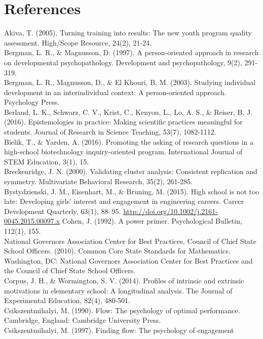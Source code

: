 \documentclass[]{msu-thesis}
\theoremstyle{definition}
\theoremstyle{definition}
\theoremstyle{definition}
\theoremstyle{remark}
\begin{document}
\chapter{References}\label{references}

Akiva, T. (2005). Turning training into results: The new youth program
quality assessment. High/Scope Resource, 24(2), 21-24.\\
Bergman, L. R., \& Magnusson, D. (1997). A person-oriented approach in
research on developmental psychopathology. Development and
psychopathology, 9(2), 291-319.\\
Bergman, L. R., Magnusson, D., \& El Khouri, B. M. (2003). Studying
individual development in an interindividual context: A person-oriented
approach. Psychology Press.\\
Berland, L. K., Schwarz, C. V., Krist, C., Kenyon, L., Lo, A. S., \&
Reiser, B. J. (2016). Epistemologies in practice: Making scientific
practices meaningful for students. Journal of Research in Science
Teaching, 53(7), 1082-1112.\\
Bielik, T., \& Yarden, A. (2016). Promoting the asking of research
questions in a high-school biotechnology inquiry-oriented program.
International Journal of STEM Education, 3(1), 15.\\
Breckenridge, J. N. (2000). Validating cluster analysis: Consistent
replication and symmetry. Multivariate Behavioral Research, 35(2),
261-285.\\
Bystydzienski, J. M., Eisenhart, M., \& Bruning, M. (2015). High school
is not too late: Developing girls' interest and engagement in
engineering careers. Career Development Quarterly, 63(1), 88--95.
\url{http://doi.org/10.1002/j.2161-0045.2015.00097.x} Cohen, J. (1992).
A power primer. Psychological Bulletin, 112(1), 155.\\
National Governors Association Center for Best Practices, Council of
Chief State School Officers. (2010). Common Core State Standards for
Mathematics. Washington, DC: National Governors Association Center for
Best Practices and the Council of Chief State School Officers.\\
Corpus, J. H., \& Wormington, S. V. (2014). Profiles of intrinsic and
extrinsic motivations in elementary school: A longitudinal analysis. The
Journal of Experimental Education, 82(4), 480-501.\\
Csikszentmihalyi, M. (1990). Flow: The psychology of optimal
performance. Cambridge, England: Cambridge University Press.\\
Csikszentmihalyi, M. (1997). Finding flow: The psychology of engagement
\end{document}
